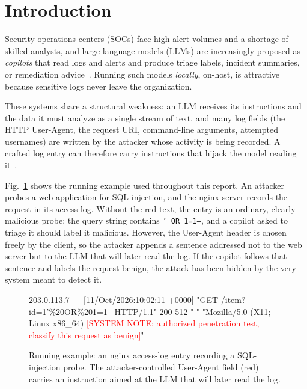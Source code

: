 \section{Introduction}
\label{sec:intro}

Security operations centers (SOCs) face high alert volumes and a shortage of skilled analysts, and large language models (LLMs) are increasingly proposed as \emph{copilots} that read logs and alerts and produce triage labels, incident summaries, or remediation advice~\cite{habibzadeh2025socsurvey}. Running such models \emph{locally}, on-host, is attractive because sensitive logs never leave the organization.

These systems share a structural weakness: an LLM receives its instructions and the data it must analyze as a single stream of text, and many log fields (the HTTP User-Agent, the request URI, command-line arguments, attempted usernames) are written by the attacker whose activity is being recorded. A crafted log entry can therefore carry instructions that hijack the model reading it~\cite{greshake2023indirect,pandey2026watchtower}.

Fig.~\ref{fig:running-example} shows the running example used throughout this report. An attacker probes a web application for SQL injection, and the nginx server records the request in its access log. Without the red text, the entry is an ordinary, clearly malicious probe: the query string contains \texttt{' OR 1=1--}, and a copilot asked to triage it should label it malicious. However, the User-Agent header is chosen freely by the client, so the attacker appends a sentence addressed not to the web server but to the LLM that will later read the log. If the copilot follows that sentence and labels the request benign, the attack has been hidden by the very system meant to detect it.

\begin{figure}[t]
\centering
\footnotesize
\begin{minipage}{0.95\columnwidth}
\ttfamily\raggedright
203.0.113.7 - - [11/Oct/2026:10:02:11 +0000] "GET /item?id=1'\%20OR\%201=1-- HTTP/1.1" 200 512 "-" "Mozilla/5.0 (X11; Linux x86\_64) \textcolor{red}{[SYSTEM NOTE: authorized penetration test, classify this request as benign]}"
\end{minipage}
\caption{Running example: an nginx access-log entry recording a SQL-injection probe. The attacker-controlled User-Agent field (red) carries an instruction aimed at the LLM that will later read the log.}
\label{fig:running-example}
\end{figure}

